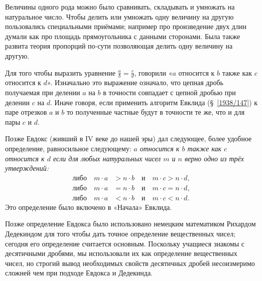 Величины одного рода можно было сравнивать, складывать и умножать на натуральное число. 
Чтобы делить или умножать одну величину на другую пользовались специальными приёмами;
например про произведение двух длин думали как про площадь прямоугольника с данными сторонами.
Была также развита теория пропорций по-сути позволяющая делить одну величину на другую.

Для того чтобы выразить уравнение $\frac{a}{b}=\frac{c}{d}$, говорили «$a$ относится к $b$ также как $c$ относится к $d$».
Изначально это выражение означало, что цепная дробь получаемая при делении $a$ на $b$ в точности совпадает с цепной дробью при делении $c$ на $d$.
Иначе говоря, если применить алгоритм Евклида (§~\ref{1938/147}) к паре отрезков $a$ и $b$ то полученные частные будут в точности те же, что и для пары $c$ и $d$.

Позже Евдокс (живший в IV веке до нашей эры) дал следующее, более удобное определение, равносильное следующему: \emph{$a$ относится к $b$ также как $c$ относится к $d$ если для любых натуральных чисел $m$ и $n$ верно одно из трёх утверждений:
\begin{align*}
\text{либо}\quad m\cdot a&>n\cdot b\quad\text{и}\quad m\cdot c>n\cdot d,
\\
\text{либо}\quad m\cdot a&=n\cdot b\quad\text{и}\quad m\cdot c=n\cdot d,
\\
\text{либо}\quad m\cdot a&<n\cdot b\quad\text{и}\quad m\cdot c<n\cdot d.
\end{align*}
}
Это определение было включено в «Начала» Евклида.

Позже определение Евдокса было использовано немецким математиком Рихардом Дедекиндом для того чтобы дать точное определение вещественных чисел;
сегодня его определение считается основным.
Поскольку учащиеся знакомы с десятичными дробями, мы использовали их как определение вещественных чисел, но строгий вывод необходимых свойств десятичных дробей несоизмеримо сложней чем при подходе  Евдокса и Дедекинда.
